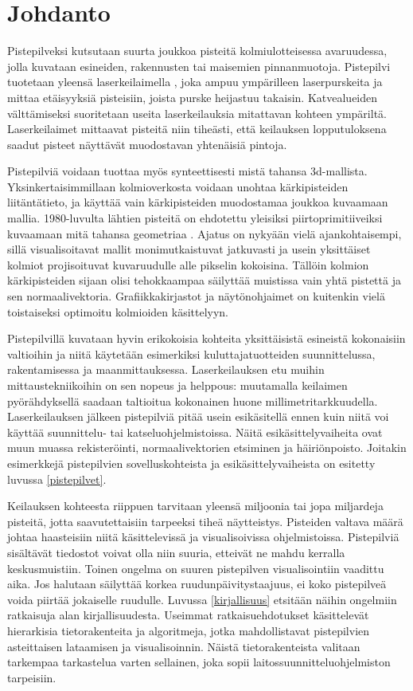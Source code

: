 \section{Johdanto}

Pistepilveksi kutsutaan suurta joukkoa pisteitä kolmiulotteisessa avaruudessa, jolla kuvataan esineiden, rakennusten tai maisemien pinnanmuotoja. Pistepilvi tuotetaan yleensä laserkeilaimella , joka ampuu ympärilleen laserpurskeita ja mittaa etäisyyksiä pisteisiin, joista purske heijastuu takaisin. Katvealueiden välttämiseksi suoritetaan useita laserkeilauksia mitattavan kohteen ympäriltä. Laserkeilaimet mittaavat pisteitä niin tiheästi, että keilauksen lopputuloksena saadut pisteet näyttävät muodostavan yhtenäisiä pintoja. 

Pistepilviä voidaan tuottaa myös synteettisesti mistä tahansa 3d-mallista. Yksinkertaisimmillaan kolmioverkosta voidaan unohtaa kärkipisteiden liitäntätieto, ja käyttää vain kärkipisteiden muodostamaa joukkoa kuvaamaan mallia. 1980-luvulta lähtien pisteitä on ehdotettu yleisiksi piirtoprimitiiveiksi kuvaamaan mitä tahansa geometriaa \cite{Whitted}. Ajatus on nykyään vielä ajankohtaisempi, sillä visualisoitavat mallit monimutkaistuvat jatkuvasti ja usein yksittäiset kolmiot projisoituvat kuvaruudulle alle pikselin kokoisina. Tällöin kolmion kärkipisteiden sijaan olisi tehokkaampaa säilyttää muistissa vain yhtä pistettä ja sen normaalivektoria. Grafiikkakirjastot ja näytönohjaimet on kuitenkin vielä toistaiseksi optimoitu kolmioiden käsittelyyn.

Pistepilvillä kuvataan hyvin erikokoisia kohteita yksittäisistä esineistä kokonaisiin valtioihin ja niitä käytetään esimerkiksi kuluttajatuotteiden suunnittelussa, rakentamisessa ja maanmittauksessa. Laserkeilauksen etu muihin mittaustekniikoihin on sen nopeus ja helppous: muutamalla keilaimen pyörähdyksellä saadaan taltioitua kokonainen huone millimetritarkkuudella. Laserkeilauksen jälkeen pistepilviä pitää usein esikäsitellä ennen kuin niitä voi käyttää suunnittelu- tai katseluohjelmistoissa. Näitä esikäsittelyvaiheita ovat muun muassa rekisteröinti, normaalivektorien etsiminen ja häiriönpoisto. Joitakin esimerkkejä pistepilvien sovelluskohteista ja esikäsittelyvaiheista on esitetty luvussa \ref{pistepilvet}.

Keilauksen kohteesta riippuen tarvitaan yleensä miljoonia tai jopa miljardeja pisteitä, jotta saavutettaisiin tarpeeksi tiheä näytteistys. Pisteiden valtava määrä johtaa haasteisiin niitä käsittelevissä ja visualisoivissa ohjelmistoissa. Pistepilviä sisältävät tiedostot voivat olla niin suuria, etteivät ne mahdu kerralla keskusmuistiin. Toinen ongelma on suuren pistepilven visualisointiin vaadittu aika. Jos halutaan säilyttää korkea ruudunpäivitystaajuus, ei koko pistepilveä voida piirtää jokaiselle ruudulle. Luvussa \ref{kirjallisuus} etsitään näihin ongelmiin ratkaisuja alan kirjallisuudesta. Useimmat ratkaisuehdotukset käsittelevät hierarkisia tietorakenteita ja algoritmeja, jotka mahdollistavat pistepilvien asteittaisen lataamisen ja visualisoinnin. Näistä tietorakenteista valitaan tarkempaa tarkastelua varten sellainen, joka sopii laitossuunnitteluohjelmiston tarpeisiin. 

